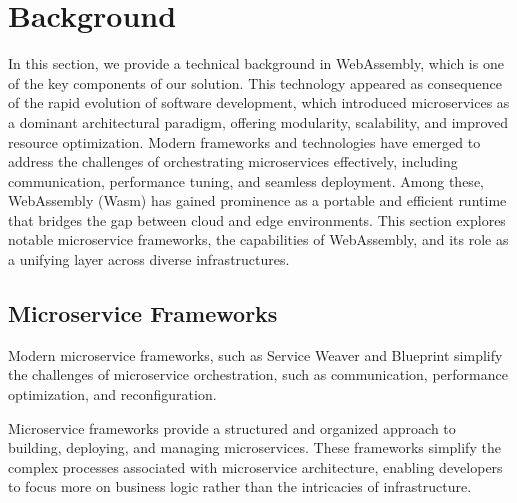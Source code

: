 

\section{Background}

In this section, we provide a technical background in WebAssembly, which is one of the key components of our solution. This technology appeared as consequence of the rapid evolution of software development, which introduced microservices as a dominant architectural paradigm, offering modularity, scalability, and improved resource optimization. Modern frameworks and technologies have emerged to address the challenges of orchestrating microservices effectively, including communication, performance tuning, and seamless deployment. Among these, WebAssembly (Wasm) has gained prominence as a portable and efficient runtime that bridges the gap between cloud and edge environments. This section explores notable microservice frameworks, the capabilities of WebAssembly, and its role as a unifying layer across diverse infrastructures.

\subsection{Microservice Frameworks}
Modern microservice frameworks, such as Service Weaver\cite{ghemawat2023towards} and Blueprint\cite{anand2023blueprint} simplify the challenges of microservice orchestration, such as communication, performance optimization, and reconfiguration.

Microservice frameworks provide a structured and organized approach to building, deploying, and managing microservices. These frameworks simplify the complex processes associated with microservice architecture, enabling developers to focus more on business logic rather than the intricacies of infrastructure. 

